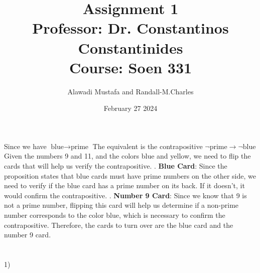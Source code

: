 \documentclass{article}
\title{Assignment 1 \\[1cm] \Large Professor: Dr. Constantinos Constantinides \\[0.5cm] Course: Soen 331}
\author{Alawadi Mustafa and Randall-M.Charles }
\date{February 27 2024}
\begin{document}
\maketitle

\section{}
Since we have $\text{blue} \rightarrow \text{prime}$\newline\newline
The equivalent is the contrapositive  $\neg \text{prime} \rightarrow \neg \text{blue}$\newline\newline
Given the numbers 9 and 11, and the colors blue and yellow, we need to flip the cards that will help us verify the contrapositive.
\newline {}. \textbf{Blue Card}: Since the proposition states that blue cards must have prime numbers on the other side, we need to verify if the blue card has a prime number on its back. If it doesn't, it would confirm the contrapositive.
\newline {}. \textbf{Number 9 Card}: Since we know that 9 is not a prime number, flipping this card will help us determine if a non-prime number corresponds to the color blue, which is necessary to confirm the contrapositive.\newline\newline
Therefore, the cards to turn over are the blue card and the number 9 card.


\section{}
\subsection{}
1) \newline
\end{document}
